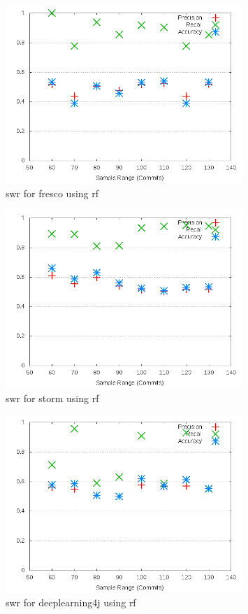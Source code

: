 \begin{figure}[h]
    \centering

        \includegraphics[width=0.8\textwidth]{images/rf/test_1/fresco_sample_range}
        \caption{\gls{swr} for fresco using \gls{rf}}
        \label{fig:test_1_fresco_rf}
\end{figure}

\begin{figure}[h]
    \centering
        \includegraphics[width=0.8\textwidth]{images/rf/test_1/storm_sample_range}
        \caption{\gls{swr} for storm using \gls{rf}}
        \label{fig:test_1_storm_rf}
\end{figure}

\begin{figure}[h]
    \centering
        \includegraphics[width=0.8\textwidth]{images/rf/test_1/deeplearning4j_sample_range}
    \caption{\gls{swr} for deeplearning4j using \gls{rf}}
    \label{fig:test_1_deeplearning4j_rf}
\end{figure}


